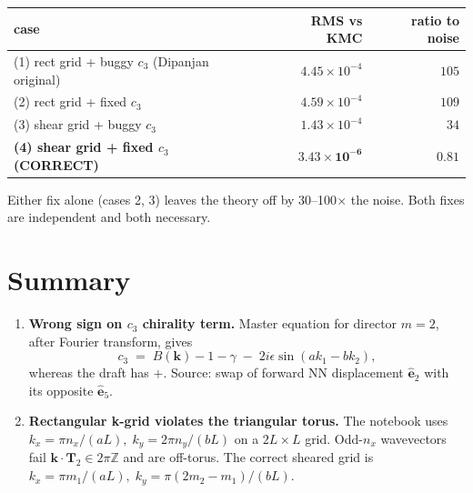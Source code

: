 \documentclass[11pt,a4paper]{article}
\newcommand{\vk}{\mathbf{k}}
\newcommand{\veps}[1]{\hat{\mathbf{e}}_{#1}}
\newcommand{\vT}[1]{\mathbf{T}_{#1}}
\begin{document}
\begin{center}\small
\renewcommand{\arraystretch}{1.18}
\begin{tabular}{lrr}
\toprule
\textbf{case} & \textbf{RMS vs KMC} & \textbf{ratio to noise} \\
\midrule
\rowcolor{badfill!50} (1) rect grid + buggy $c_3$ (Dipanjan original) & $4.45 \times 10^{-4}$ & $105$ \\
\rowcolor{badfill!30} (2) rect grid + fixed $c_3$ & $4.59 \times 10^{-4}$ & $109$ \\
\rowcolor{badfill!30} (3) shear grid + buggy $c_3$ & $1.43 \times 10^{-4}$ & $34$ \\
\rowcolor{goodfill!60} \textbf{(4) shear grid + fixed $c_3$ (CORRECT)} & $\mathbf{3.43 \times 10^{-6}}$ & $\mathbf{0.81}$ \\
\bottomrule
\end{tabular}
\end{center}

Either fix alone (cases 2, 3) leaves the theory off by 30--100$\times$
the noise. Both fixes are independent and both necessary.

\section{Summary}\label{sec:summary}

\begin{keyresult}
\begin{enumerate}[leftmargin=*]
\item \textbf{Wrong sign on $c_3$ chirality term.} Master equation for
  director $m=2$, after Fourier transform, gives
  \[
  c_3 \;=\; B(\vk) - 1 - \gamma \;-\; 2 i \epsilon \sin(a k_1 - b k_2),
  \]
  whereas the draft has $+$. Source: swap of forward NN displacement
  $\veps{2}$ with its opposite $\veps{5}$.

\item \textbf{Rectangular k-grid violates the triangular torus.}
  The notebook uses $k_x = \pi n_x/(aL),\; k_y = 2\pi n_y/(bL)$ on a
  $2L\times L$ grid. Odd-$n_x$ wavevectors fail
  $\vk \cdot \vT{2} \in 2\pi\mathbb{Z}$ and are off-torus.
  The correct sheared grid is
  $k_x = \pi m_1/(aL),\; k_y = \pi(2 m_2 - m_1)/(bL)$.
\end{enumerate}
\end{keyresult}
\end{document}
